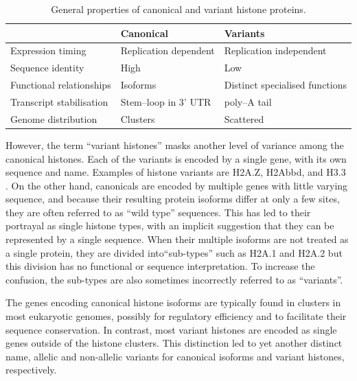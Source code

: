 \documentclass[10pt,a4paper,onecolumn,article]{memoir}
\begin{document}
    \begin{table}
      \caption{General properties of canonical and variant histone proteins.}
      \label{tab:typical-histone-differences}
      \centering
      \begin{tabular}{l l l}
        \toprule
        \null                     & Canonical             & Variants \\
        \midrule
        Expression timing         & Replication dependent & Replication independent \\
        Sequence identity         & High                  & Low \\
        Functional relationships  & Isoforms              & Distinct specialised functions \\
        Transcript stabilisation  & Stem--loop in 3' UTR  & poly--A tail \\
        Genome distribution       & Clusters              & Scattered \\
        \bottomrule
      \end{tabular}
    \end{table}

    However, the term ``variant histones'' masks another level of variance among the canonical
    histones. Each of the variants is encoded by a single gene, with its own sequence and
    name. Examples of histone variants are H2A.Z, H2Abbd, and H3.3 \citep{variants-review}.
    On the other hand, canonicals are encoded by multiple genes with little varying sequence,
    and because their resulting protein isoforms differ at only a few sites, they are often
    referred to as ``wild type'' sequences. This has led to their portrayal as single histone
    types, with an implicit suggestion that they can be represented by a single sequence.
    When their multiple isoforms are not treated as a single protein, they are divided
    into``sub-types'' such as H2A.1 and H2A.2 but this division has no functional or sequence
    interpretation. To increase the confusion, the sub-types are also sometimes incorrectly
    referred to as ``variants''.

    The genes encoding canonical histone isoforms are typically found in clusters in most eukaryotic
    genomes, possibly for regulatory efficiency and to facilitate their sequence conservation. In
    contrast, most variant histones are encoded as single genes outside of the histone clusters.
    This distinction led to yet another distinct name, allelic and non-allelic variants for
    canonical isoforms and variant histones, respectively.
\end{document}
